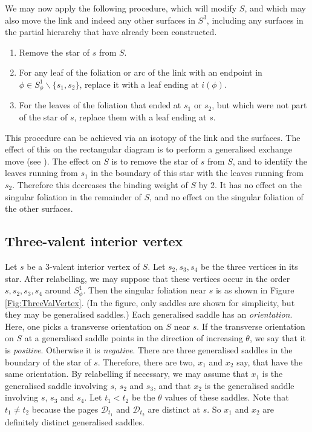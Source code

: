 \documentclass[oneside]{amsart}
\numberwithin{equation}{section}
\theoremstyle{plain}
\theoremstyle{definition}
\begin{document}
We may now apply the following procedure, which will modify $S$, and which may also move the link and indeed
any other surfaces in $S^3$, including any surfaces in the partial hierarchy that have already been constructed.
\begin{enumerate}
\item Remove the star of $s$ from $S$.
\item For any leaf of the foliation or arc of the link with an endpoint in $\phi \in S^1_\phi \backslash \{s_1, s_2 \}$, replace it with a leaf
ending at $i(\phi)$.
\item For the leaves of the foliation that ended at $s_1$ or $s_2$, but which were not part of
the star of $s$, replace them with a leaf ending at $s$.
\end{enumerate}
This procedure can be achieved via an isotopy of the link and the surfaces. The effect
of this on the rectangular diagram is to perform a generalised exchange move (see \cite{Dynnikov}). The effect on $S$
is to remove the star of $s$ from $S$, and to identify the leaves running from $s_1$ in the boundary of this star
with the leaves running from $s_2$. Therefore this decreases the binding weight of $S$ by 2. It has no effect on
the singular foliation in the remainder of $S$, and no effect on the singular foliation of the other surfaces.

\subsection{Three-valent interior vertex}
\label{Subsec:ThreeValInterior}

Let $s$ be a 3-valent interior vertex of $S$. Let $s_2, s_3, s_4$ be the three vertices in its star.
After relabelling, we may suppose that these vertices occur in the order $s, s_2, s_3, s_4$
around $S^1_\phi$. Then the singular foliation near $s$ is as shown in Figure \ref{Fig:ThreeValVertex}.
(In the figure, only saddles are shown for simplicity, but they may be generalised saddles.)
Each generalised saddle has an \emph{orientation}. Here, one picks a transverse orientation on $S$ near $s$.
If the transverse orientation on $S$ at a generalised saddle points in the direction of increasing $\theta$,
we say that it is \emph{positive}. Otherwise it is \emph{negative}. There are three generalised saddles
in the boundary of the star of $s$. Therefore, there are two, $x_1$ and $x_2$ say, that have the
same orientation. By relabelling if necessary, we may assume that
$x_1$ is the generalised saddle involving $s$, $s_2$ and $s_3$,
and that $x_2$ is the generalised saddle involving $s$, $s_3$ and $s_4$.
Let $t_1 < t_2$ be the $\theta$ values of these saddles. 
Note that $t_1 \not= t_2$ because the pages $\mathcal{D}_{t_1}$ and $\mathcal{D}_{t_2}$ are distinct at $s$.
So $x_1$ and $x_2$ are definitely distinct generalised saddles.
\end{document}
